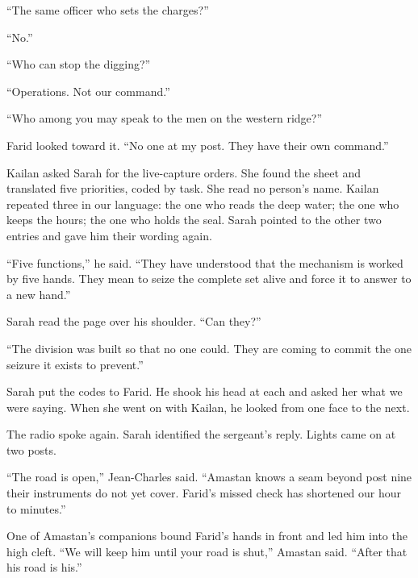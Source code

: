 ``The same officer who sets the charges?''\par

``No.''\par

``Who can stop the digging?''\par

``Operations. Not our command.''\par

``Who among you may speak to the men on the western ridge?''\par

Farid looked toward it. ``No one at my post. They have their own command.''\par

Kailan asked Sarah for the live-capture orders. She found the sheet and translated five priorities, coded by task. She read no person's name. Kailan repeated three in our language: the one who reads the deep water; the one who keeps the hours; the one who holds the seal. Sarah pointed to the other two entries and gave him their wording again.\par

``Five functions,'' he said. ``They have understood that the mechanism is worked by five hands. They mean to seize the complete set alive and force it to answer to a new hand.''\par

Sarah read the page over his shoulder. ``Can they?''\par

``The division was built so that no one could. They are coming to commit the one seizure it exists to prevent.''\par

Sarah put the codes to Farid. He shook his head at each and asked her what we were saying. When she went on with Kailan, he looked from one face to the next.\par

The radio spoke again. Sarah identified the sergeant's reply. Lights came on at two posts.\par

``The road is open,'' Jean-Charles said. ``Amastan knows a seam beyond post nine their instruments do not yet cover. Farid's missed check has shortened our hour to minutes.''\par

One of Amastan's companions bound Farid's hands in front and led him into the high cleft. ``We will keep him until your road is shut,'' Amastan said. ``After that his road is his.''\par

